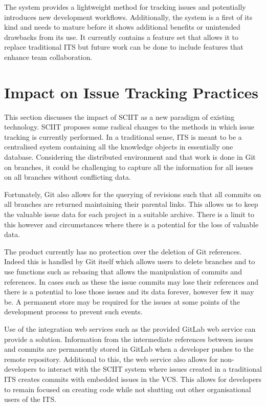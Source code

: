 \documentclass{mproj}
\begin{document}
The system provides a lightweight method for tracking issues and potentially introduces new development workflows. Additionally, the system is a first of its kind and needs to mature before it shows additional benefits or unintended drawbacks from its use. It currently contains a feature set that allows it to replace traditional ITS but future work can be done to include features that enhance team collaboration.



\section{Impact on Issue Tracking Practices}

This section discusses the impact of SCIIT as a new paradigm of existing technology. SCIIT proposes some radical changes to the methods in which issue tracking is currently performed. In a traditional sense, ITS is meant to be a centralised system containing all the knowledge objects in essentially one database. Considering the distributed environment and that work is done in Git on branches, it could be challenging to capture all the information for all issues on all branches without conflicting data.

Fortunately, Git also allows for the querying of revisions such that all commits on all branches are returned maintaining their parental links. This allows us to keep the valuable issue data for each project in a suitable archive. There is a limit to this however and circumstances where there is a potential for the loss of valuable data.

The product currently has no protection over the deletion of Git references. Indeed this is handled by Git itself which allows users to delete branches and to use functions such as rebasing that allows the manipulation of commits and references. In cases such as these the issue commits may lose their references and there is a potential to lose those issues and its data forever, however few it may be. A permanent store may be required for the issues at some points of the development process to prevent such events.

Use of the integration web services such as the provided GitLab web service can provide a solution. Information from the intermediate references between issues and commits are permanently stored in GitLab when a developer pushes to the remote repository. Additional to this, the web service also allows for non-developers to interact with the SCIIT system where issues created in a traditional ITS creates commits with embedded issues in the VCS. This allows for developers to remain focused on creating code while not shutting out other organisational users of the ITS.
\end{document}
